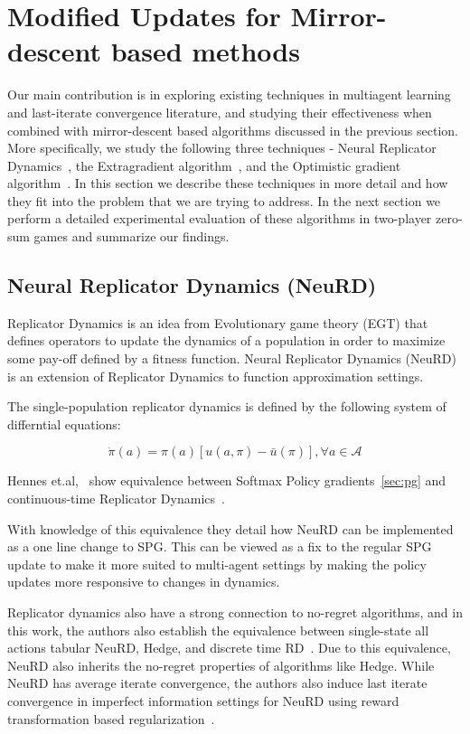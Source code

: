 \chapter{Modified Updates for Mirror-descent based methods}

Our main contribution is in exploring existing techniques in multiagent learning and last-iterate convergence 
literature, and studying their effectiveness when combined with mirror-descent based algorithms
discussed in the previous section.
More specifically, we study the following three techniques - Neural Replicator Dynamics~\cite{hennesNeural2020}, 
the Extragradient algorithm~\cite{korpelevichextragradient1976}, 
and the Optimistic gradient algorithm~\cite{popovmodification1980}.
In this section we describe these techniques in more detail and how they fit into the problem that we are 
trying to address.
In the next section we perform a detailed experimental evaluation of these algorithms in two-player zero-sum 
games and summarize our findings.

\section{Neural Replicator Dynamics (NeuRD)}
Replicator Dynamics is an idea from Evolutionary game theory (EGT) that defines operators to update
the dynamics of a population in order to maximize some pay-off defined by a fitness function.
Neural Replicator Dynamics (NeuRD) is an extension of Replicator Dynamics 
to function approximation settings.

The single-population replicator dynamics is defined by the following system of differntial
equations:

\begin{equation}
	\label{eqn:rd} \dot{\pi}(a) = \pi(a)[u(a, \pi) -
		\bar{u}(\pi)], \forall a \in \mathcal{A}
\end{equation}

Hennes et.al,~\cite{hennesNeural2020} show equivalence between Softmax Policy gradients~\ref{sec:pg} and
continuous-time Replicator Dynamics~\cite[THEOREM 1, on p5]{hennesNeural2020}\label{thm:spgrd}.

With knowledge of this equivalence they detail how NeuRD can be implemented as a one line change to SPG.
This can be viewed as a fix to the regular SPG update to make it more suited to multi-agent settings 
by making the policy updates more responsive to changes in dynamics.

Replicator dynamics also have a strong connection to no-regret algorithms, and in this work, the authors also establish 
the equivalence between single-state all actions tabular NeuRD, Hedge, and discrete time RD~\cite[Statement 1, p5]{hennesNeural2020}.
Due to this equivalence, NeuRD also inherits the no-regret properties of algorithms like Hedge.
While NeuRD has average iterate convergence, the authors also induce last iterate convergence in imperfect 
information settings for NeuRD using reward transformation based regularization~\cite{perolatPoincare2021}.

